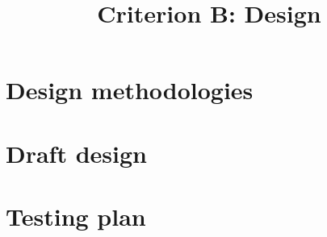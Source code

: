 

\title{Criterion B: Design}


\maketitle

\section{Design methodologies}

\section{Draft design}

\section{Testing plan}


